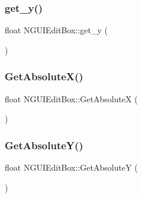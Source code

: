 \hypertarget{class_n_g_u_i_edit_box_a33a26a15bf02fb57f1dc1fec683639ed}{}\label{class_n_g_u_i_edit_box_a33a26a15bf02fb57f1dc1fec683639ed} 
\subsubsection{\texorpdfstring{get\+\_\+y()}{get\_y()}}
{\footnotesize\ttfamily float N\+G\+U\+I\+Edit\+Box\+::get\+\_\+y (\begin{DoxyParamCaption}{ }\end{DoxyParamCaption})}

\hypertarget{class_n_g_u_i_edit_box_a1ee192f04f4bfaa7df4e5c7612b58758}{}\label{class_n_g_u_i_edit_box_a1ee192f04f4bfaa7df4e5c7612b58758} 
\subsubsection{\texorpdfstring{Get\+Absolute\+X()}{GetAbsoluteX()}}
{\footnotesize\ttfamily float N\+G\+U\+I\+Edit\+Box\+::\+Get\+AbsoluteX (\begin{DoxyParamCaption}{ }\end{DoxyParamCaption})}

\hypertarget{class_n_g_u_i_edit_box_a963e5cc3bda5a2033e143dd0a3551c7c}{}\label{class_n_g_u_i_edit_box_a963e5cc3bda5a2033e143dd0a3551c7c} 
\subsubsection{\texorpdfstring{Get\+Absolute\+Y()}{GetAbsoluteY()}}
{\footnotesize\ttfamily float N\+G\+U\+I\+Edit\+Box\+::\+Get\+AbsoluteY (\begin{DoxyParamCaption}{ }\end{DoxyParamCaption})}

\hypertarget{class_n_g_u_i_edit_box_a74a547d2048fcddbff60e16ce2afeca9}{}\label{class_n_g_u_i_edit_box_a74a547d2048fcddbff60e16ce2afeca9} 

